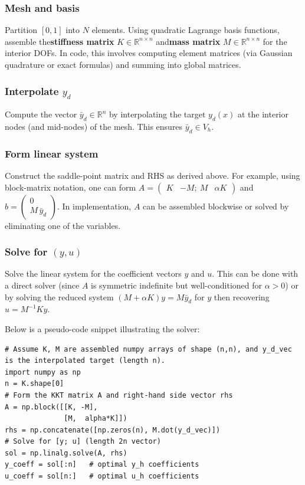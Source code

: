 \documentclass[a4paper,10pt]{article}
\begin{document}
\subsubsection{Mesh and basis}
Partition \([0,1]\) into \(N\) elements. Using quadratic Lagrange basis functions, assemble the\textbf{stiffness matrix} \(K\in\mathbb{R}^{n\times n}\) and\textbf{mass matrix} \(M\in\mathbb{R}^{n\times n}\) for the interior DOFs. In code, this involves computing element matrices (via Gaussian quadrature or exact formulas) and summing into global matrices.

\subsubsection{Interpolate \(y_d\)}
Compute the vector \(\bar y_d\in\mathbb{R}^n\) by interpolating the target \(y_d(x)\) at the interior nodes (and mid-nodes) of the mesh. This ensures \(\bar y_d \in V_h\).

\subsubsection{Form linear system}
Construct the saddle-point matrix and RHS as derived above. For example, using block-matrix notation, one can form \(A = \begin{pmatrix}K & -M;~M & \alpha K\end{pmatrix}\) and \(b = \begin{pmatrix}0 \\ M\,\bar y_d\end{pmatrix}\). In implementation, \(A\) can be assembled blockwise or solved by eliminating one of the variables.

\subsubsection{Solve for \((y,u)\)}
Solve the linear system for the coefficient vectors \(y\) and \(u\). This can be done with a direct solver (since \(A\) is symmetric indefinite but well-conditioned for \(\alpha>0\)) or by solving the reduced system \((M + \alpha K)y = M\bar y_d\) for \(y\) then recovering \(u = M^{-1}K y\).

Below is a pseudo-code snippet illustrating the solver:
\begin{verbatim}
# Assume K, M are assembled numpy arrays of shape (n,n), and y_d_vec is the interpolated target (length n).
import numpy as np
n = K.shape[0]
# Form the KKT matrix A and right-hand side vector rhs
A = np.block([[K, -M],
              [M,  alpha*K]])
rhs = np.concatenate([np.zeros(n), M.dot(y_d_vec)])
# Solve for [y; u] (length 2n vector)
sol = np.linalg.solve(A, rhs)
y_coeff = sol[:n]   # optimal y_h coefficients
u_coeff = sol[n:]   # optimal u_h coefficients
\end{verbatim}
\end{document}
